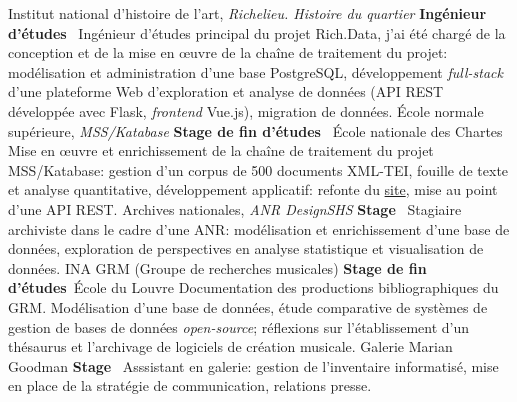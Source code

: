 	{%
		Institut national d'histoire de l'art, \textit{Richelieu. Histoire du quartier}}
	{%
		\textbf{Ingénieur d'études}~}
	{%
		Ingénieur d'études principal du projet Rich.Data, j'ai été chargé de la conception et de la mise en \oe{}uvre de la chaîne de traitement du projet: modélisation et administration d'une base PostgreSQL, développement \textit{full-stack} d'une plateforme Web d'exploration et analyse de données (API REST développée avec Flask, \textit{frontend} Vue.js), migration de données.}
	{%
		École normale supérieure, \textit{MSS/Katabase}}
	{%
		\textbf{Stage de fin d'études}~ École nationale des Chartes}
	{%
		Mise en \oe{}uvre et enrichissement de la chaîne de traitement du projet MSS/Katabase: gestion d'un corpus de 500 documents XML-TEI, fouille de texte et analyse quantitative, développement applicatif: refonte du \href{https://katabase.huma-num.fr/}{site}, mise au point d'une API REST.}
	{%
		Archives nationales, \textit{ANR DesignSHS}}
	{%
		\textbf{Stage}~}
	{%
		Stagiaire archiviste dans le cadre d’une ANR: modélisation et enrichissement d'une base
		de données, exploration de perspectives en analyse statistique et visualisation de données.}
	{%
		INA GRM (Groupe de recherches musicales)}
	{%
		\textbf{Stage de fin d'études}~École du Louvre}
	{%
		Documentation des productions bibliographiques du GRM. Modélisation d'une base de données, étude comparative de systèmes de gestion de bases de données \textit{open-source}; réflexions sur l'établissement d’un thésaurus et l'archivage de logiciels de création musicale.}
	{%
		Galerie Marian Goodman}
	{%
		\textbf{Stage}~}
	{%
		Asssistant en galerie: gestion de l'inventaire informatisé, mise en place de la stratégie de communication, relations presse.}